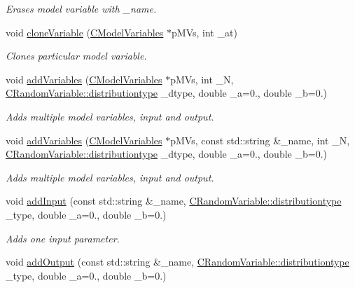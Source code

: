 \begin{DoxyCompactItemize}
\begin{DoxyCompactList}\small\item\em Erases model variable with \-\_\-name. \end{DoxyCompactList}\item 
void \hyperlink{class_go_s_u_m_1_1_c_container_a1831138d146cd61401aa87fc59c1c30a}{clone\-Variable} (\hyperlink{class_go_s_u_m_1_1_c_model_variables}{C\-Model\-Variables} $\ast$p\-M\-Vs, int \-\_\-at)
\begin{DoxyCompactList}\small\item\em Clones particular model variable. \end{DoxyCompactList}\item 
void \hyperlink{class_go_s_u_m_1_1_c_container_aa25f1986d7da9947e06d511cc9f33aff}{add\-Variables} (\hyperlink{class_go_s_u_m_1_1_c_model_variables}{C\-Model\-Variables} $\ast$p\-M\-Vs, int \-\_\-\-N, \hyperlink{class_c_random_variable_a80d2a87c43847274138b51f7d713d7f1}{C\-Random\-Variable\-::distributiontype} \-\_\-dtype, double \-\_\-a=0., double \-\_\-b=0.)
\begin{DoxyCompactList}\small\item\em Adds multiple model variables, input and output. \end{DoxyCompactList}\item 
void \hyperlink{class_go_s_u_m_1_1_c_container_a2d75ed7759d54780bbde34338bd67cfa}{add\-Variables} (\hyperlink{class_go_s_u_m_1_1_c_model_variables}{C\-Model\-Variables} $\ast$p\-M\-Vs, const std\-::string \&\-\_\-name, int \-\_\-\-N, \hyperlink{class_c_random_variable_a80d2a87c43847274138b51f7d713d7f1}{C\-Random\-Variable\-::distributiontype} \-\_\-dtype, double \-\_\-a=0., double \-\_\-b=0.)
\begin{DoxyCompactList}\small\item\em Adds multiple model variables, input and output. \end{DoxyCompactList}\item 
void \hyperlink{class_go_s_u_m_1_1_c_container_a081dddd9a16be180450b0e5609411d93}{add\-Input} (const std\-::string \&\-\_\-name, \hyperlink{class_c_random_variable_a80d2a87c43847274138b51f7d713d7f1}{C\-Random\-Variable\-::distributiontype} \-\_\-type, double \-\_\-a=0., double \-\_\-b=0.)
\begin{DoxyCompactList}\small\item\em Adds one input parameter. \end{DoxyCompactList}\item 
void \hyperlink{class_go_s_u_m_1_1_c_container_a44fcff3b27b16a00e9da88f0e9d3c147}{add\-Output} (const std\-::string \&\-\_\-name, \hyperlink{class_c_random_variable_a80d2a87c43847274138b51f7d713d7f1}{C\-Random\-Variable\-::distributiontype} \-\_\-type, double \-\_\-a=0., double \-\_\-b=0.)

\end{DoxyCompactItemize}

